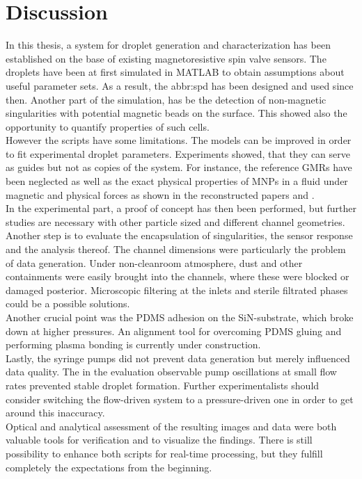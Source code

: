 \chapter{Discussion}
In this thesis, a system for droplet generation and characterization has been established on the base of existing magnetoresistive spin valve sensors. The droplets have been at first simulated in MATLAB to obtain assumptions about useful parameter sets. As a result, the \acrfull{abbr:spd} has been designed and used since then. Another part of the simulation, has be the detection of non-magnetic singularities with potential magnetic beads on the surface. This showed also the opportunity to quantify properties of such cells. \\
However the scripts have some limitations. The models can be improved in order to fit experimental droplet parameters. Experiments showed, that they can serve as guides but not as copies of the system. For instance, the reference GMRs have been neglected as well as the exact physical properties of MNPs in a fluid under magnetic and physical forces as shown in the reconstructed papers \cite{lit:fluidics:droplet:formation:t-junction:numerical} and \cite{lit:exp:droplet_formation}.\\
In the experimental part, a proof of concept has then been performed, but further studies are necessary with other particle sized and different channel geometries. Another step is to evaluate the encapsulation of singularities, the sensor response and the analysis thereof. The channel dimensions were particularly the problem of data generation. Under non-cleanroom atmosphere, dust and other containments were easily brought into the channels, where these were blocked or damaged posterior. Microscopic filtering at the inlets and sterile filtrated phases could be a possible solutions.\\
Another crucial point was the PDMS adhesion on the SiN-substrate, which broke down at higher pressures. An alignment tool for overcoming PDMS gluing and performing plasma bonding is currently under construction.\\
Lastly, the syringe pumps did not prevent data generation but merely influenced data quality. The in the evaluation observable pump oscillations at small flow rates prevented stable droplet formation. Further experimentalists should consider switching the flow-driven system to a pressure-driven one in order to get around this inaccuracy. \\
Optical and analytical assessment of the resulting images and data were both valuable tools for verification and to visualize the findings. There is still possibility to enhance both scripts for real-time processing, but they fulfill completely the expectations from the beginning. 
\clearpage
\newpage\null\thispagestyle{empty}\newpage
